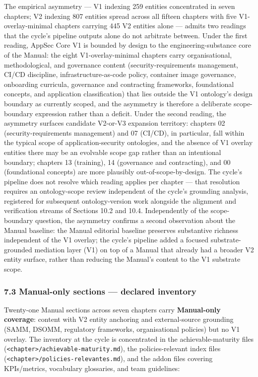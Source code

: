 \documentclass[
]{article}
\begin{document}
The empirical asymmetry --- V1 indexing 259 entities concentrated in
seven chapters; V2 indexing 807 entities spread across all fifteen
chapters with five V1-overlay-minimal chapters carrying 445 V2 entities
alone --- admits two readings that the cycle's pipeline outputs alone do
not arbitrate between. Under the first reading, AppSec Core V1 is
bounded by design to the engineering-substance core of the Manual: the
eight V1-overlay-minimal chapters carry organisational, methodological,
and governance content (security-requirements management, CI/CD
discipline, infrastructure-as-code policy, container image governance,
onboarding curricula, governance and contracting frameworks,
foundational concepts, and application classification) that lies outside
the V1 ontology's design boundary as currently scoped, and the asymmetry
is therefore a deliberate scope-boundary expression rather than a
deficit. Under the second reading, the asymmetry surfaces candidate
V2-or-V3 expansion territory: chapters 02 (security-requirements
management) and 07 (CI/CD), in particular, fall within the typical scope
of application-security ontologies, and the absence of V1 overlay
entities there may be an evolvable scope gap rather than an intentional
boundary; chapters 13 (training), 14 (governance and contracting), and
00 (foundational concepts) are more plausibly out-of-scope-by-design.
The cycle's pipeline does not resolve which reading applies per chapter
--- that resolution requires an ontology-scope review independent of the
cycle's grounding analysis, registered for subsequent ontology-version
work alongside the alignment and verification streams of Sections 10.2
and 10.4. Independently of the scope-boundary question, the asymmetry
confirms a second observation about the Manual baseline: the Manual
editorial baseline preserves substantive richness independent of the V1
overlay; the cycle's pipeline added a focused substrate-grounded
mediation layer (V1) on top of a Manual that already had a broader V2
entity surface, rather than reducing the Manual's content to the V1
substrate scope.

\subsubsection{7.3 Manual-only sections --- declared
inventory}\label{manual-only-sections-declared-inventory}

Twenty-one Manual sections across seven chapters carry
\textbf{Manual-only coverage}: content with V2 entity anchoring and
external-source grounding (SAMM, DSOMM, regulatory frameworks,
organisational policies) but no V1 overlay. The inventory at the cycle
is concentrated in the achievable-maturity files
(\texttt{\textless{}chapter\textgreater{}/achievable-maturity.md}), the
policies-relevant index files
(\texttt{\textless{}chapter\textgreater{}/policies-relevantes.md}), and
the addon files covering KPIs/metrics, vocabulary glossaries, and team
guidelines:
\end{document}
